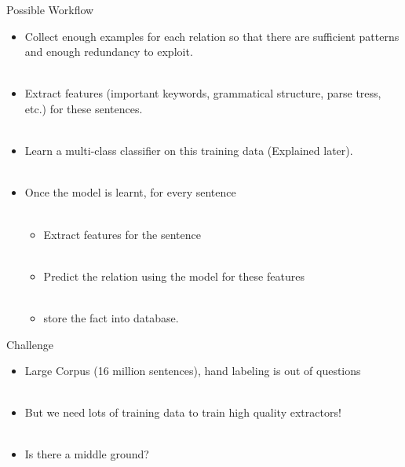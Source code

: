 \documentclass{beamer}
\begin{document}
\begin{frame}{Possible Workflow} \pause
  \begin{itemize}
   \item Collect enough examples for each relation so that there are sufficient patterns and enough redundancy to exploit.\pause  \\~\\
   \item Extract features (important keywords, grammatical structure, parse tress, etc.) for these sentences. \pause \\~\\
   \item Learn a multi-class classifier on this training data (Explained later). \pause \\~\\
   \item Once the model is learnt, for every sentence \pause \\~\\
    \begin{itemize}
	\item Extract features for the sentence \pause \\~\\
	\item Predict the relation using the model for these features \pause \\~\\
	\item store the fact into database. 
     \end{itemize}
  \end{itemize}
\end{frame}

\begin{frame}{Challenge}
 \begin{itemize}
  \item Large Corpus (16 million sentences), hand labeling is out of questions \pause \\~\\
  \item But we need lots of training data to train high quality extractors! \pause \\~\\
  \item Is there a middle ground?
 \end{itemize}
\end{frame}
\end{document}
